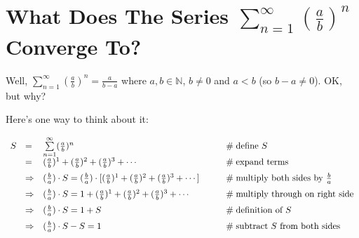 \documentclass[11pt, oneside]{article}   	%
\begin{document}
\section*{What Does The Series $\sum\limits_{n = 1}^\infty (\frac{a}{b})^n $ Converge To?}

\noindent
Well,  $\sum\limits_{n = 1}^\infty (\frac{a}{b})^n  = \frac{a}{b - a}$ where $a,b \in \mathbb{N}$, $b \neq 0$ and $a < b$ (so $b - a \neq 0$). OK, but why?

\bigskip
\noindent
 Here's one way to think about it:  
      
\begin{equation*}
\begin{array}{lllll}
S
&=& \sum\limits_{n = 1}^\infty (\frac{a}{b})^n                                                                                                                &\qquad  \mathrel{\#} \text{define $S$}                                          \\ 
\vspace{2.0mm}
&=& (\frac{a}{b})^1 + (\frac{a}{b})^2 + (\frac{a}{b})^3 + \cdots                                                                                      &\qquad  \mathrel{\#} \text{expand terms}                                      \\
\vspace{2.0mm}
&\Rightarrow& (\frac{b}{a}) \cdot S = (\frac{b}{a}) \cdot [(\frac{a}{b})^1 + (\frac{a}{b})^2 + (\frac{a}{b})^3 + \cdots ]   &\qquad  \mathrel{\#} \text{multiply both sides by $\frac{b}{a}$}     \\
\vspace{2.0mm}
&\Rightarrow&  (\frac{b}{a}) \cdot S = 1 +(\frac{a}{b})^1 + (\frac{a}{b})^2 + (\frac{a}{b})^3 + \cdots                            &\qquad  \mathrel{\#} \text{multiply through on right side}              \\
\vspace{2.0mm}
&\Rightarrow&  (\frac{b}{a}) \cdot S = 1 + S                                                                                                                &\qquad  \mathrel{\#} \text{definition of $S$}                                   \\
\vspace{2.0mm}
&\Rightarrow&  (\frac{b}{a}) \cdot S - S = 1                                                                                                                 &\qquad  \mathrel{\#} \text{subtract $S$ from both sides}               \\
\vspace{2.0mm}

\end{array}
\end{equation*}
\end{document}
